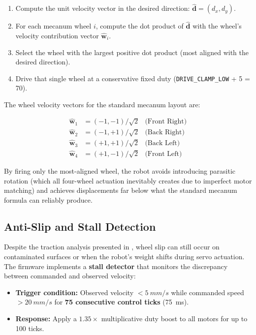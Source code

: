 \documentclass[12pt, a4paper, twoside]{article}
\begin{document}
\begin{enumerate}
    \item Compute the unit velocity vector in the desired direction: $\hat{\mathbf{d}} = (d_x, d_y)$.
    \item For each mecanum wheel $i$, compute the dot product of $\hat{\mathbf{d}}$ with the wheel's velocity contribution vector $\hat{\mathbf{w}}_i$.
    \item Select the wheel with the largest positive dot product (most aligned with the desired direction).
    \item Drive that single wheel at a conservative fixed duty (\texttt{DRIVE\_CLAMP\_LOW} + 5 = 70).
\end{enumerate}

The wheel velocity vectors for the standard mecanum layout are:

\begin{align}
    \hat{\mathbf{w}}_1 &= (-1, -1)/\sqrt{2} & \text{(Front Right)} \\
    \hat{\mathbf{w}}_2 &= (-1, +1)/\sqrt{2} & \text{(Back Right)} \\
    \hat{\mathbf{w}}_3 &= (+1, +1)/\sqrt{2} & \text{(Back Left)} \\
    \hat{\mathbf{w}}_4 &= (+1, -1)/\sqrt{2} & \text{(Front Left)}
\end{align}

By firing only the most-aligned wheel, the robot avoids introducing parasitic rotation (which all four-wheel actuation inevitably creates due to imperfect motor matching) and achieves displacements far below what the standard mecanum formula can reliably produce.

\subsection{Anti-Slip and Stall Detection}

Despite the traction analysis presented in , wheel slip can still occur on contaminated surfaces or when the robot's weight shifts during servo actuation. The firmware implements a \textbf{stall detector} that monitors the discrepancy between commanded and observed velocity:

\begin{itemize}
    \item \textbf{Trigger condition:} Observed velocity $< \SI{5}{mm/s}$ while commanded speed $> \SI{20}{mm/s}$ for \textbf{75 consecutive control ticks} (\SI{75}{\milli\second}).
    \item \textbf{Response:} Apply a $1.35\times$ multiplicative duty boost to all motors for up to 100 ticks.
\end{itemize}
\end{document}
